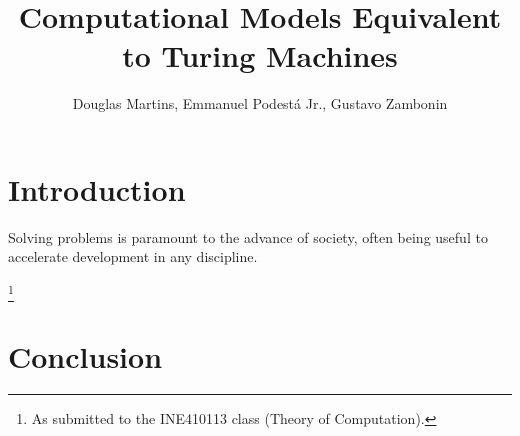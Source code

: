 \documentclass[12pt]{article}
\title{Computational Models Equivalent to Turing Machines}
\author{Douglas Martins\inst{1}, Emmanuel Podestá Jr.\inst{1}, Gustavo Zambonin\inst{1}}
\begin{document}
 

\maketitle

\section{Introduction}\label{sec:intro}
 
Solving problems is paramount to the advance of society, often being useful to accelerate development in any discipline. 

\footnote{As submitted to the INE410113 class (Theory of Computation).}


\section{Conclusion}\label{sec:conc}




\end{document}

